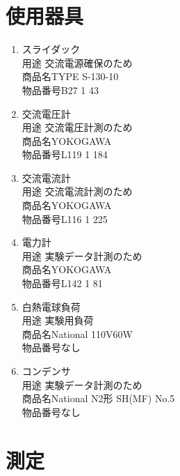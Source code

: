\documentclass[titlepage]{jarticle}
\begin{document}
\section{使用器具}
\begin{enumerate}
    \item スライダック\\用途 交流電源確保のため\\商品名TYPE S-130-10\\物品番号B27 1 43
    \item 交流電圧計\\用途 交流電圧計測のため\\商品名YOKOGAWA\\物品番号L119 1 184
    \item 交流電流計\\用途 交流電流計測のため\\商品名YOKOGAWA\\物品番号L116 1 225
    \item 電力計\\用途 実験データ計測のため\\商品名YOKOGAWA\\物品番号L142 1 81
    \item 白熱電球負荷\\用途 実験用負荷\\商品名National 110V60W\\物品番号なし
    \item コンデンサ\\用途 実験データ計測のため\\商品名National N2形 SH(MF) No.5\\物品番号なし
\end{enumerate}

\section{測定}
\end{document}

